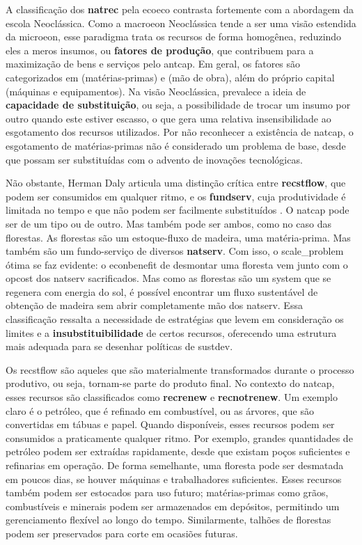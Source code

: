 \documentclass[./main.tex]{subfiles}
\begin{document}
\par A classificação dos \textbf{\gls{natrec}} pela \gls{ecoeco} contrasta fortemente com a abordagem da escola Neoclássica. Como a \gls{macroeon} Neoclássica tende a ser uma visão estendida da \gls{microeon}, esse \gls{paradigma} trata os recursos de forma homogênea, reduzindo eles a meros insumos, ou \textbf{fatores de produção}, que contribuem para a maximização de bens e serviços pelo \gls{antcap}. Em geral, os fatores são categorizados em  (matérias-primas) e  (mão de obra), além do próprio capital (máquinas e equipamentos). Na visão Neoclássica, prevalece a ideia de \textbf{capacidade de substituição}, ou seja, a possibilidade de trocar um insumo por outro quando este estiver escasso, o que gera uma relativa insensibilidade ao esgotamento dos recursos utilizados. Por não reconhecer a existência de \gls{natcap}, o esgotamento de matérias-primas não é considerado um problema de base, desde que possam ser substituídas com o advento de inovações tecnológicas. 

\par Não obstante, Herman Daly articula uma distinção crítica entre \textbf{\gls{recstflow}}, que podem ser consumidos em qualquer ritmo, e os \textbf{\gls{fundserv}}, cuja produtividade é limitada no tempo e que não podem ser facilmente substituídos \cite{daly2011}. O \gls{natcap} pode ser de um tipo ou de outro. Mas também pode ser ambos, como no caso das florestas. As florestas são um estoque-fluxo de madeira, uma matéria-prima. Mas também são um fundo-serviço de diversos \textbf{\gls{natserv}}. Com isso, o \gls{scale_problem} ótima se faz evidente: o \gls{econbenefit} de desmontar uma floresta vem junto com o \gls{opcost} dos \gls{natserv} sacrificados. Mas como as florestas são um \gls{system} que se regenera com energia do sol, é possível encontrar um fluxo sustentável de obtenção de madeira sem abrir completamente mão dos \gls{natserv}. Essa classificação ressalta a necessidade de estratégias que levem em consideração os limites e a \textbf{insubstituibilidade} de certos recursos, oferecendo uma estrutura mais adequada para se desenhar políticas de \gls{sustdev}.

\par Os \gls{recstflow} são aqueles que são materialmente transformados durante o processo produtivo, ou seja, tornam-se parte do produto final. No contexto do \gls{natcap}, esses recursos são classificados como \textbf{\gls{recrenew}} e \textbf{\gls{recnotrenew}}. Um exemplo claro é o petróleo, que é refinado em combustível, ou as árvores, que são convertidas em tábuas e papel. Quando disponíveis, esses recursos podem ser consumidos a praticamente qualquer ritmo. Por exemplo, grandes quantidades de petróleo podem ser extraídas rapidamente, desde que existam poços suficientes e refinarias em operação. De forma semelhante, uma floresta pode ser desmatada em poucos dias, se houver máquinas e trabalhadores suficientes. Esses recursos também podem ser estocados para uso futuro; matérias-primas como grãos, combustíveis e minerais podem ser armazenados em depósitos, permitindo um gerenciamento flexível ao longo do tempo. Similarmente, talhões de florestas podem ser preservados para corte em ocasiões futuras. 
\end{document}
